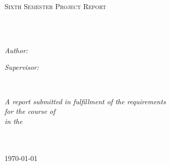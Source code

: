 \documentclass[
11pt, %
oneside, %
english, %
singlespacing, %
nohyperref, %
headsepline, %
]{MastersDoctoralThesis} %
\author{Ashish \textsc{Panigrahi}} %
\begin{document}
\frontmatter %

\pagestyle{plain} %


\begin{titlepage}
\begin{center}

\vspace*{.06\textheight}
{\scshape\LARGE \univname\par}\vspace{1.5cm} %
\textsc{\Large Sixth Semester Project Report}\\[0.5cm] %

\HRule \\[0.4cm] %
{\huge \bfseries \ttitle\par}\vspace{0.4cm} %
\HRule \\[1.5cm] %

\begin{minipage}[t]{0.4\textwidth}
\begin{flushleft} \large
\emph{Author:}\\
{\authorname} %
\end{flushleft}
\end{minipage}
\begin{minipage}[t]{0.4\textwidth}
\begin{flushright} \large
\emph{Supervisor:} \\
{\supname} %
\end{flushright}
\end{minipage}\\[3cm]

\vfill

\large \textit{A report submitted in fulfillment of the requirements\\ for the course of \degreename}\\[0.3cm] %
\textit{in the}\\[0.4cm]
\groupname\\\deptname\\[2cm] %

\vfill

{\large \today}\\[4cm] %

\vfill
\end{center}
\end{titlepage}
\end{document}
